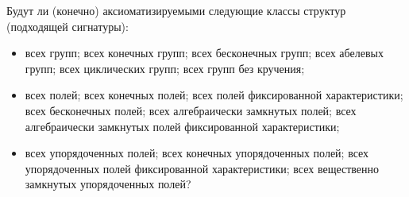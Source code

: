     \begin{problem}[2]
        Будут ли (конечно) аксиоматизируемыми следующие классы структур (подходящей сигнатуры):
        \begin{itemize}
            \item всех групп; всех конечных групп; всех бесконечных групп; всех абелевых групп; всех циклических групп; всех групп без кручения;
            \item всех полей; всех конечных полей; всех полей фиксированной характеристики; всех бесконечных полей; всех алгебраически замкнутых полей; всех алгебраически замкнутых полей фиксированной характеристики;
            \item всех упорядоченных полей; всех конечных упорядоченных полей; всех упорядоченных полей фиксированной характеристики; всех вещественно замкнутых упорядоченных полей?
        \end{itemize}
    \end{problem}
